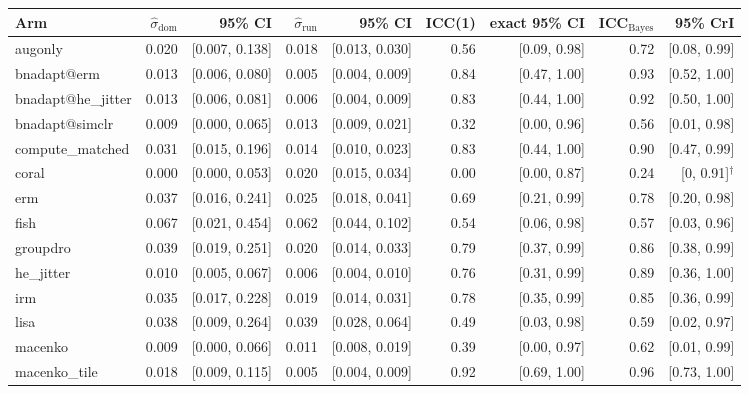 \begin{tabular}{lrrrrrrrr}
\toprule
Arm & $\hat\sigma_\text{dom}$ & 95\% CI & $\hat\sigma_\text{run}$ & 95\% CI & ICC(1) & exact 95\% CI & ICC$_\text{Bayes}$ & 95\% CrI \\
\midrule
augonly & 0.020 & [0.007, 0.138] & 0.018 & [0.013, 0.030] & 0.56 & [0.09, 0.98] & 0.72 & [0.08, 0.99] \\
bnadapt@erm & 0.013 & [0.006, 0.080] & 0.005 & [0.004, 0.009] & 0.84 & [0.47, 1.00] & 0.93 & [0.52, 1.00] \\
bnadapt@he\_jitter & 0.013 & [0.006, 0.081] & 0.006 & [0.004, 0.009] & 0.83 & [0.44, 1.00] & 0.92 & [0.50, 1.00] \\
bnadapt@simclr & 0.009 & [0.000, 0.065] & 0.013 & [0.009, 0.021] & 0.32 & [0.00, 0.96] & 0.56 & [0.01, 0.98] \\
compute\_matched & 0.031 & [0.015, 0.196] & 0.014 & [0.010, 0.023] & 0.83 & [0.44, 1.00] & 0.90 & [0.47, 0.99] \\
coral & 0.000 & [0.000, 0.053] & 0.020 & [0.015, 0.034] & 0.00 & [0.00, 0.87] & 0.24 & [0, 0.91]$^\dagger$ \\
erm & 0.037 & [0.016, 0.241] & 0.025 & [0.018, 0.041] & 0.69 & [0.21, 0.99] & 0.78 & [0.20, 0.98] \\
fish & 0.067 & [0.021, 0.454] & 0.062 & [0.044, 0.102] & 0.54 & [0.06, 0.98] & 0.57 & [0.03, 0.96] \\
groupdro & 0.039 & [0.019, 0.251] & 0.020 & [0.014, 0.033] & 0.79 & [0.37, 0.99] & 0.86 & [0.38, 0.99] \\
he\_jitter & 0.010 & [0.005, 0.067] & 0.006 & [0.004, 0.010] & 0.76 & [0.31, 0.99] & 0.89 & [0.36, 1.00] \\
irm & 0.035 & [0.017, 0.228] & 0.019 & [0.014, 0.031] & 0.78 & [0.35, 0.99] & 0.85 & [0.36, 0.99] \\
lisa & 0.038 & [0.009, 0.264] & 0.039 & [0.028, 0.064] & 0.49 & [0.03, 0.98] & 0.59 & [0.02, 0.97] \\
macenko & 0.009 & [0.000, 0.066] & 0.011 & [0.008, 0.019] & 0.39 & [0.00, 0.97] & 0.62 & [0.01, 0.99] \\
macenko\_tile & 0.018 & [0.009, 0.115] & 0.005 & [0.004, 0.009] & 0.92 & [0.69, 1.00] & 0.96 & [0.73, 1.00] \\

\end{tabular}
